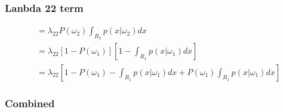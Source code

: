 \documentclass{IEEEtran}
\begin{document}
\subsubsection{Lanbda 22 term}
\begin{align*}
    &= \lambda_{22}P(\omega_2)\int_{R_2}p(x|\omega_2)dx \\
    &= \lambda_{22}\left[1 - P(\omega_1)\right] \left[1 - \int_{R_1}p(x|\omega_1)dx \right] \\
    &= \lambda_{22}\left[1 - P(\omega_1) - \int_{R_1}p(x|\omega_1)dx + P(\omega_1)\int_{R_1}p(x|\omega_1)dx \right]
\end{align*}

\subsubsection{Combined}
\end{document}
